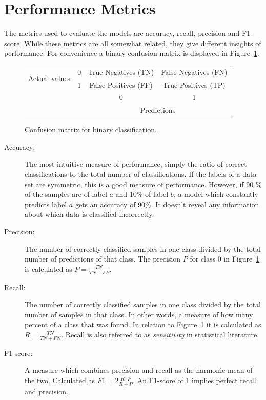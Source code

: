 \section{Performance Metrics}
The metrics used to evaluate the models are accuracy, recall, precision and F1-score. While these metrics are all somewhat related, they give different insights of performance. For convenience a binary confusion matrix is displayed in Figure~\ref{fig:confmat}. 

\begin{figure}[h]
\centering
\begin{tabular}{cccc}
     \multirow{2}{*}{Actual values} & 0 & \multicolumn{1}{|c|}{True Negatives (TN)} &  \multicolumn{1}{c|}{False Negatives (FN)} \\
     \cline{2-4}
      & 1 & \multicolumn{1}{|c|}{False Positives (FP)} & \multicolumn{1}{c|}{True Positives (TP)} \\ 
      \cline{2-4}
     & & \multicolumn{1}{|c|}{0} & \multicolumn{1}{c|}{1}\\
     
     & & \multicolumn{2}{c}{Predictions} \\
\end{tabular}
\caption{Confusion matrix for binary classification.}
\label{fig:confmat}
\end{figure}

\begin{description}
    \item[Accuracy:] The most intuitive measure of performance, simply the ratio of correct classifications to the total number of classifications. If the labels of a data set are symmetric, this is a good measure of performance. However, if 90 \%  of the samples are of label $a$ and 10\% of label $b$, a model which constantly predicts label $a$ gets an accuracy of 90\%. It doesn't reveal any information about which data is classified incorrectly. 
    \item[Precision:] The number of correctly classified samples in one class divided by the total number of predictions of that class. The precision $P$ for class 0 in Figure~\ref{fig:confmat} is calculated as $\displaystyle{P = \frac{TN}{TN + FP}}$. 
    \item[Recall:] The number of correctly classified samples in one class divided by the total number of samples in that class. In other words, a measure of how many percent of a class that was found. In relation to Figure~\ref{fig:confmat} it is calculated as $\displaystyle{R = \frac{TN}{TN + FN}}$. Recall is also referred to as \textit{sensitivity} in statistical literature. 
    \item[F1-score:] A measure which combines precision and recall as the harmonic mean of the two. Calculated as $\displaystyle{F1 = 2 \frac{R \cdot P}{R + P}}$. An F1-score of 1 implies perfect recall and precision.
\end{description}

